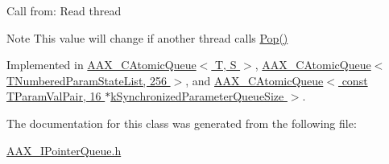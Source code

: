 Call from\+: Read thread

\begin{DoxyNote}{Note}
This value will change if another thread calls \hyperlink{a00110_a49990f21819f0f4493183ea0770d4125}{Pop()} 
\end{DoxyNote}


Implemented in \hyperlink{a00010_a0b82e81edc0d63a81c1b41acaf2a493d}{A\+A\+X\+\_\+\+C\+Atomic\+Queue$<$ T, S $>$}, \hyperlink{a00010_a0b82e81edc0d63a81c1b41acaf2a493d}{A\+A\+X\+\_\+\+C\+Atomic\+Queue$<$ T\+Numbered\+Param\+State\+List, 256 $>$}, and \hyperlink{a00010_a0b82e81edc0d63a81c1b41acaf2a493d}{A\+A\+X\+\_\+\+C\+Atomic\+Queue$<$ const T\+Param\+Val\+Pair, 16 $\ast$k\+Synchronized\+Parameter\+Queue\+Size $>$}.



The documentation for this class was generated from the following file\+:\begin{DoxyCompactItemize}
\item 
\hyperlink{a00258}{A\+A\+X\+\_\+\+I\+Pointer\+Queue.\+h}\end{DoxyCompactItemize}
